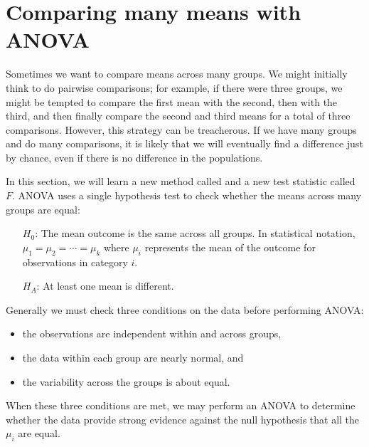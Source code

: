 \section{Comparing many means with ANOVA}
\label{anovaAndRegrWithCategoricalVariables}


\noindent%
Sometimes we want to compare means across many groups. We might initially think to do pairwise comparisons; for example, if there were three groups, we might be tempted to compare the first mean with the second, then with the third, and then finally compare the second and third means for a total of three comparisons. However, this strategy can be treacherous. If we have many groups and do many comparisons, it is likely that we will eventually find a difference just by chance, even if there is no difference in the populations.

In this section, we will learn a new method called  and a new test statistic called $F$. ANOVA uses a single hypothesis test to check whether the means across many groups are equal:
\begin{itemize}
\setlength{\itemsep}{0mm}
\item[$H_0$:] The mean outcome is the same across all groups. In statistical notation, $\mu_1 = \mu_2 = \cdots = \mu_k$ where $\mu_i$ represents the mean of the outcome for observations in category $i$.
\item[$H_A$:] At least one mean is different.
\end{itemize}
Generally we must check three conditions on the data before performing ANOVA:
\begin{itemize}
\setlength{\itemsep}{0mm}
\item the observations are independent within and across groups,
\item the data within each group are nearly normal, and
\item the variability across the groups is about equal.
\end{itemize}
When these three conditions are met, we may perform an ANOVA to determine whether the data provide strong evidence against the null hypothesis that all the $\mu_i$ are equal.

